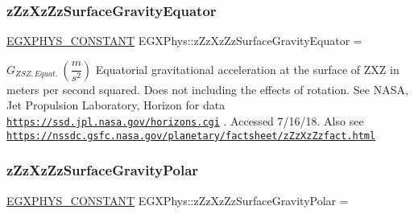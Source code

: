 \subsubsection{\texorpdfstring{z\+Zz\+Xz\+Zz\+Surface\+Gravity\+Equator}{zZzXzZzSurfaceGravityEquator}}
{\footnotesize\ttfamily \mbox{\hyperlink{group___e_g_x_phys-_constants-_macros_ga76980d288494ce1714c9ac68a95ba702}{E\+G\+X\+P\+H\+Y\+S\+\_\+\+C\+O\+N\+S\+T\+A\+NT}} E\+G\+X\+Phys\+::z\+Zz\+Xz\+Zz\+Surface\+Gravity\+Equator =}

$ G_{ZSZ,Equat.} \ (\dfrac{m}{s^2})$ Equatorial gravitational acceleration at the surface of Z\+XZ in meters per second squared. Does not including the effects of rotation. See N\+A\+SA, Jet Propulsion Laboratory, Horizon for data \href{https://ssd.jpl.nasa.gov/horizons.cgi}{\tt https\+://ssd.\+jpl.\+nasa.\+gov/horizons.\+cgi} . Accessed 7/16/18. Also see \href{https://nssdc.gsfc.nasa.gov/planetary/factsheet/zZzXzZzfact.html}{\tt https\+://nssdc.\+gsfc.\+nasa.\+gov/planetary/factsheet/z\+Zz\+Xz\+Zzfact.\+html} \mbox{\label{group___e_g_x_phys-_constants-_astrophysics-_solar_system-_z_x_z-_bulk_ga9c01974fd6f077c76383acdaeeb26fb7}} 
\subsubsection{\texorpdfstring{z\+Zz\+Xz\+Zz\+Surface\+Gravity\+Polar}{zZzXzZzSurfaceGravityPolar}}
{\footnotesize\ttfamily \mbox{\hyperlink{group___e_g_x_phys-_constants-_macros_ga76980d288494ce1714c9ac68a95ba702}{E\+G\+X\+P\+H\+Y\+S\+\_\+\+C\+O\+N\+S\+T\+A\+NT}} E\+G\+X\+Phys\+::z\+Zz\+Xz\+Zz\+Surface\+Gravity\+Polar =}

